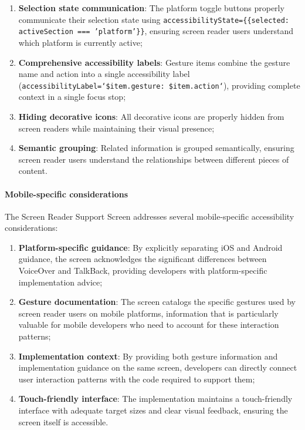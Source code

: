 \begin{enumerate}
    \item \textbf{Selection state communication}: The platform toggle buttons properly communicate their selection state using \texttt{accessibilityState=\{\{selected: activeSection === 'platform'\}\}}, ensuring screen reader users understand which platform is currently active;
    
    \item \textbf{Comprehensive accessibility labels}: Gesture items combine the gesture name and action into a single accessibility label (\texttt{accessibilityLabel=`\${item.gesture}: \${item.action}`}), providing complete context in a single focus stop;
    
    \item \textbf{Hiding decorative icons}: All decorative icons are properly hidden from screen readers while maintaining their visual presence;
    
    \item \textbf{Semantic grouping}: Related information is grouped semantically, ensuring screen reader users understand the relationships between different pieces of content.
\end{enumerate}

\paragraph{Mobile-specific considerations}

The Screen Reader Support Screen addresses several mobile-specific accessibility considerations:

\begin{enumerate}
    \item \textbf{Platform-specific guidance}: By explicitly separating iOS and Android guidance, the screen acknowledges the significant differences between VoiceOver and TalkBack, providing developers with platform-specific implementation advice;
    
    \item \textbf{Gesture documentation}: The screen catalogs the specific gestures used by screen reader users on mobile platforms, information that is particularly valuable for mobile developers who need to account for these interaction patterns;
    
    \item \textbf{Implementation context}: By providing both gesture information and implementation guidance on the same screen, developers can directly connect user interaction patterns with the code required to support them;
    
    \item \textbf{Touch-friendly interface}: The implementation maintains a touch-friendly interface with adequate target sizes and clear visual feedback, ensuring the screen itself is accessible.
\end{enumerate}

